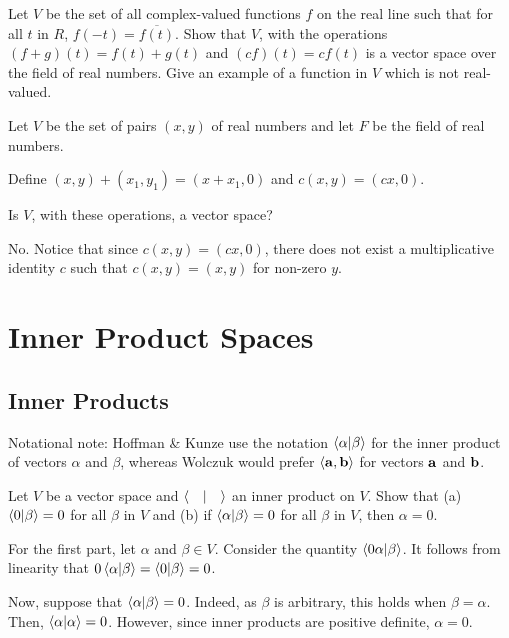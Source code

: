 \documentclass[notes]{agony}
\begin{document}
\begin{xca}
  Let $V$ be the set of all complex-valued functions $f$ on the real line
  such that for all $t$ in $R$, $f(-t) = \overline{f(t)}$.
  Show that $V$, with the operations $(f+g)(t) = f(t)+g(t)$ and $(cf)(t) = c f(t)$
  is a vector space over the field of real numbers.
  Give an example of a function in $V$ which is not real-valued.
\end{xca}
\begin{prf}
  
\end{prf}

\begin{xca}
  Let $V$ be the set of pairs $(x,y)$ of real numbers
  and let $F$ be the field of real numbers.

  Define $(x,y) + (x_1,y_1) = (x+x_1,0)$ and $c(x,y) = (cx,0)$.

  Is $V$, with these operations, a vector space?
\end{xca}
\begin{sol}
  No. Notice that since $c(x,y) = (cx,0)$,
  there does not exist a multiplicative identity $c$
  such that $c(x,y) = (x,y)$ for non-zero $y$.
\end{sol}

\setcounter{chapter}{7}
\chapter{Inner Product Spaces}

\section{Inner Products}

Notational note: Hoffman \& Kunze use the notation $\ip{\alpha}{\beta}$ for the inner product of vectors $\alpha$ and $\beta$,
whereas Wolczuk would prefer $\ev{\vb{a}, \vb{b}}$ for vectors $\vb a$ and $\vb b$.

\begin{xca}
  Let $V$ be a vector space and $\ip{\quad}$ an inner product on $V$.
  Show that (a) $\ip{0}{\beta}=0$ for all $\beta$ in $V$ and (b) if $\ip{\alpha}{\beta} = 0$ for all $\beta$ in $V$, then $\alpha = 0$.
\end{xca}
\begin{prf}
  For the first part, let $\alpha$ and $\beta \in V$.
  Consider the quantity $\ip{0\alpha}{\beta}$.
  It follows from linearity that $0\ip{\alpha}{\beta} = \ip{0}{\beta} = 0$.

  Now, suppose that $\ip{\alpha}{\beta} = 0$.
  Indeed, as $\beta$ is arbitrary, this holds when $\beta = \alpha$.
  Then, $\ip{\alpha} = 0$.
  However, since inner products are positive definite, $\alpha = 0$.
\end{prf}
\end{document}
